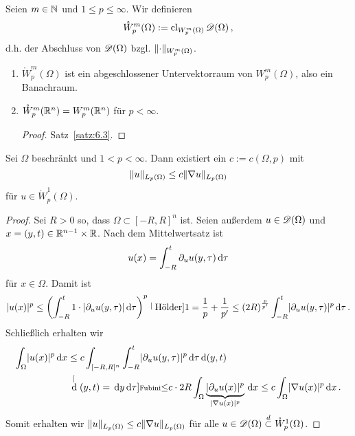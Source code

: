 
\begin{defi}
  Seien $m\in\mathbb{N}$ und $1\leq p\leq\infty$. Wir definieren
  \[ \mathring{W}_p^m(\Omega):=\operatorname{cl}_{W_p^m(\Omega)}\mathscr{D}(\Omega) \, , \]
  d.h. der Abschluss von $\mathscr{D} (\Omega)$ bzgl. $\lVert \cdot\rVert_{W_p^m(\Omega)}$.
\end{defi}

\begin{bem}
  \begin{enumerate}[\rm(a)]
  \item $\mathring{W}_p^m(\Omega)$ ist ein abgeschlossener Untervektorraum von $W_p^m(\Omega)$, also ein Banachraum. 
  \item $\mathring{W}_p^m(\mathbb{R}^n)=W_p^m(\mathbb{R}^n)$ für $p<\infty$.
    \begin{proof}
      Satz~\ref{satz:6.3}.
    \end{proof}
  \end{enumerate}
\end{bem}

\begin{theorem}
  \label{theorem:6.8} Sei $\Omega$ beschränkt und $1<p<\infty$. Dann existiert ein $c:=c(\Omega,p)$ mit
  \[ \lVert u\rVert_{L_p(\Omega)}\leq c\lVert \nabla u\rVert_{L_p(\Omega)} \]
  für $u\in\mathring{W}_p^1(\Omega)$.
\end{theorem}

\begin{proof}
  Sei $R>0$ so, dass $\Omega\subset[-R,R]^n$ ist. Seien außerdem $u\in\mathscr{D}(\Omega)$ und $x=(y,t)\in\mathbb{R}^{n-1}\times\mathbb{R}$. Nach dem Mittelwertsatz ist
  \[ u(x)=\int_{-R}^t\partial_u u(y,\tau)\,\mathrm{d}\tau \]
  für $x\in\Omega$. Damit ist
  \[
  \lvert u(x)\rvert^p\leq\left(
    \int_{-R}^t 1\cdot\lvert \partial_u u(y,\tau)\rvert\,\mathrm{d}\tau
  \right)^p
  \stackrel[\scriptsize\text{Hölder}]{1=\frac 1p+\frac 1{p'}}\leq
  (2R)^{\frac p{p'}}\int_{-R}^t\lvert \partial_u u(y,\tau)\rvert^p\,\mathrm{d}\tau\, .
  \]
  Schließlich erhalten wir
  \[
  \begin{split}
    \int_\Omega\lvert u(x)\rvert^p\,\mathrm{d} x&\leq c\int_{[-R,R]^n}\int_{-R}^t\lvert \partial_u u(y,\tau)\rvert^p\,\mathrm{d}\tau\,\mathrm{d}(y,t) \\
    &\stackrel[{\,\mathrm{d}}(y,t)=\,\mathrm{d} y\,\mathrm{d}\tau]{ \scriptsize\text{Fubini}}{\leq}
    c\cdot 2R\int_\Omega\underbrace{\lvert \partial_u u(x)\rvert^p}_{\lvert \nabla u(x)\rvert^p}\,\mathrm{d} x
    \leq c\int_\Omega\lvert \nabla u(x)\rvert^p\,\mathrm{d} x\, .
  \end{split}
  \]
  Somit erhalten wir $\lVert u\rVert_{L_p(\Omega)}\leq c\lVert \nabla u\rVert_{L_p(\Omega)}$ für alle $u\in\mathscr{D}(\Omega)\overset d\subset\mathring{W}_p^1(\Omega)$.
\end{proof}

